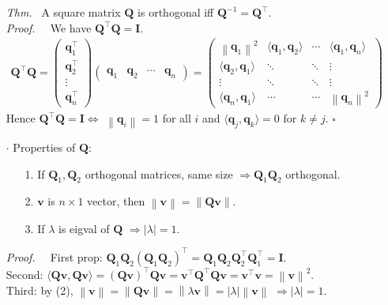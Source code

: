 \documentclass[a4paper, 11pt]{article}
\begin{document}
\begin{itemize}
	\item[\textit{Thm.~}] A square matrix $\bm{Q}$ is orthogonal iff $\bm{Q}^{-1} = \bm{Q}^{\top}$.\\
	\textit{Proof.~~} We have $\bm{Q}^{\top} \bm{Q}=\bm{I}$.
	\begin{equation*}
		\begin{split}
			\bm{Q}^{\top} \bm{Q} = \begin{pmatrix}
				\bm{q}_1^{\top} \\
				\bm{q}_2^{\top} \\
				\vdots\\
				\bm{q}_n^{\top}
			\end{pmatrix}
			\begin{pmatrix}
				\bm{q}_1 & \bm{q}_2 & \cdots & \bm{q}_n
			\end{pmatrix} = 
			\begin{pmatrix}
				\left\|\bm{q}_1\right\|^2 & \langle \bm{q}_1, \bm{q}_2 \rangle & \cdots & \langle \bm{q}_1, \bm{q}_n \rangle\\
				\langle \bm{q}_2, \bm{q}_1 \rangle & \ddots & \ddots & \vdots\\
				\vdots & \ddots & \ddots & \vdots\\
				\langle \bm{q}_n, \bm{q}_1 \rangle & \cdots & \cdots & \left\|\bm{q}_n\right\|^2
			\end{pmatrix}
		\end{split}
	\end{equation*}
	Hence $\bm{Q}^{\top} \bm{Q}=\bm{I} \iff$ $\left\|\bm{q}_i\right\|=1$ for all $i$ and $\langle \bm{q}_j, \bm{q}_k \rangle=0$ for $k\ne j$. $\square$
	\item[$\cdot$] Properties of $\bm{Q}$:
	\begin{itemize}
		\item[1.] If $\bm{Q}_1, \bm{Q}_2$ orthogonal matrices, same size $\Rightarrow \bm{Q}_1 \bm{Q}_2$ orthogonal.
		\item[2.] $\bm{v}$ is $n\times 1$ vector, then $\left\|\bm{v}\right\| = \left\|\bm{Qv}\right\|$.
		\item[3.] If $\lambda$ is eigval of $\bm{Q}$ $\Rightarrow |\lambda| = 1$.
	\end{itemize}
	\textit{Proof.~~} First prop: $\bm{Q}_1 \bm{Q}_2 (\bm{Q}_1 \bm{Q}_2)^{\top} = \bm{Q}_1 \bm{Q}_2 \bm{Q}_2^{\top} \bm{Q}_1^{\top} = \bm{I}$. \\
	Second: $\langle \bm{Qv}, \bm{Qv} \rangle = (\bm{Qv})^{\top} \bm{Qv} = \bm{v}^{\top} \bm{Q}^{\top} \bm{Q}\bm{v} = \bm{v}^{\top} \bm{v} = \left\|\bm{v}\right\|^2$. \\
	Third: by (2), $\left\|\bm{v}\right\| = \left\|\bm{Qv}\right\| = \left\|\lambda\bm{v} \right\| = |\lambda| \left\|\bm{v}\right\|$ $\Rightarrow |\lambda|=1$.
\end{itemize}
\end{document}
